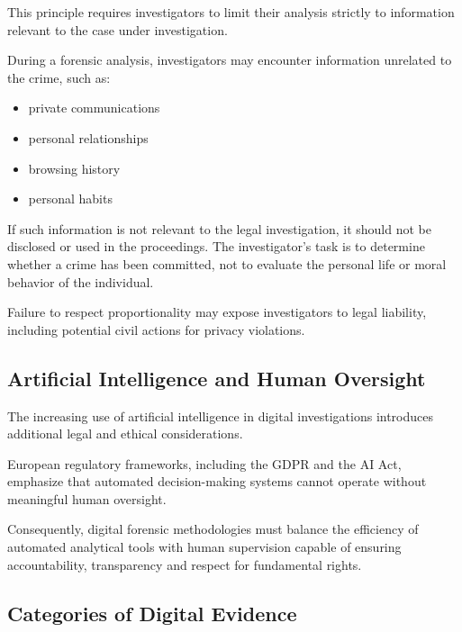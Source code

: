 \medskip

\noindent
This principle requires investigators to limit their analysis strictly to information relevant to the case under investigation.

\medskip

\noindent
During a forensic analysis, investigators may encounter information unrelated to the crime, such as:

\begin{itemize}
\item private communications
\item personal relationships
\item browsing history
\item personal habits
\end{itemize}

\medskip

\noindent
If such information is not relevant to the legal investigation, it should not be disclosed or used in the proceedings. The investigator's task is to determine whether a crime has been committed, not to evaluate the personal life or moral behavior of the individual.

\medskip

\noindent
Failure to respect proportionality may expose investigators to legal liability, including potential civil actions for privacy violations.

\subsection{Artificial Intelligence and Human Oversight}

\noindent
The increasing use of artificial intelligence in digital investigations introduces additional legal and ethical considerations.

\medskip

\noindent
European regulatory frameworks, including the GDPR and the AI Act, emphasize that automated decision-making systems cannot operate without meaningful human oversight.

\medskip

\noindent
Consequently, digital forensic methodologies must balance the efficiency of automated analytical tools with human supervision capable of ensuring accountability, transparency and respect for fundamental rights.




\subsection{Categories of Digital Evidence}

